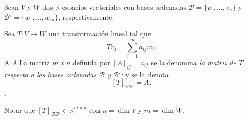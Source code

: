 \documentclass[handout]{beamer} %
\newcommand{\K}{\mathbb K}
\newcommand{\cC}{\mathcal{C}}
\newcommand{\cB}{\mathcal{B}}
\begin{document}
    
    
    \begin{frame}
              
        \begin{definicion} Sean $V$ y $W$  dos $\K$-espacios vectoriales con bases ordenadas $\mathcal B = \{v_1,\ldots,v_n\}$  y $\mathcal B' = \{w_1,\ldots,w_m\}$, respectivamente. 
            
            Sea $T: V \to W$ una transformación lineal tal que 
            \begin{equation*}\label{matriz-de-T-1}
                Tv_j = \sum_{i=1}^{m} a_{ij} w_i.
            \end{equation*}
            A  $A$  La matriz $m \times n$  definida por $[A]_{ij} = a_{ij}$ se la  denomina \textit{la matriz de $T$ respecto a las bases ordenadas $\mathcal B$ y $\mathcal B'$;} y se la denota 
            $$
            [T]_{\mathcal B \mathcal B'} = A .
            $$.
        \end{definicion}
    
        \pause
    Notar que $[T]_{\cB\cB'}\in\K^{m\times n}$ con $n=\dim V$ y $m=\dim W$.
    \end{frame}
    
    
    \begin{frame}
    
        
    \end{frame}   
\end{document}
